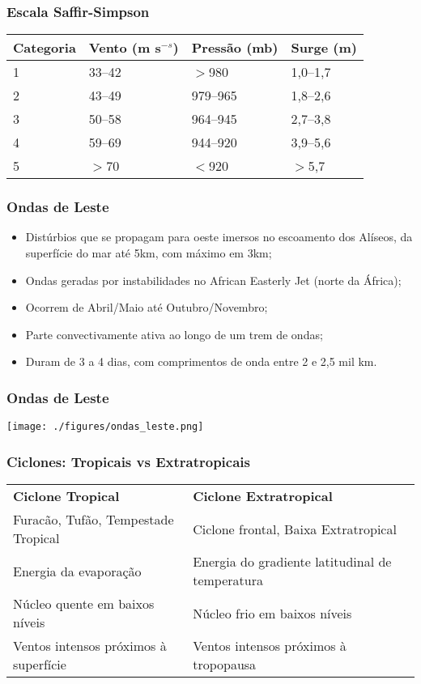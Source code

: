 \begin{frame}
\frametitle{Escala Saffir-Simpson}
{\small
\begin{table}[h]
  \begin{tabular}{|l|l|l|l|}
  \hline
  {\bf Categoria} & {\bf Vento (m s$^{-s}$)} & \bf {Pressão (mb)} & {\bf Surge (m)}\\  \hline \hline
  1 &  33--42 & $>$980   & 1,0--1,7 \\ \hline
  2 &  43--49 & 979--965 & 1,8--2,6 \\ \hline
  3 &  50--58 & 964--945 & 2,7--3,8 \\ \hline
  4 &  59--69 & 944--920 & 3,9--5,6 \\ \hline
  5 &  $>$70  & $<$920   & $>$5,7   \\ \hline
  \end{tabular}
\end{table}
}
\end{frame}

\begin{frame}
\frametitle{Ondas de Leste}
\begin{itemize}[<+-| alert@+>]
  \item Distúrbios que se propagam para oeste imersos no escoamento dos
        Alíseos, da superfície do mar até 5km, com máximo em 3km;
  \item Ondas geradas por instabilidades no African Easterly Jet (norte da
        África);
  \item Ocorrem de Abril/Maio até Outubro/Novembro;
  \item Parte convectivamente ativa ao longo de um trem de ondas;
  \item Duram de 3 a 4 dias, com comprimentos de onda entre 2 e 2,5 mil km.
\end{itemize}
\end{frame}


\begin{frame}
\frametitle{Ondas de Leste}
  \begin{center}
    \texttt{[image: ./figures/ondas\_leste.png]}
  \end{center}
\end{frame}

\begin{frame}
\frametitle{Ciclones: Tropicais vs Extratropicais}
{\scriptsize
\begin{table}[h]
  \begin{tabular}{l|l}
  \hline\hline
  {\bf Ciclone Tropical} & {\bf Ciclone Extratropical} \\
  Furacão, Tufão, Tempestade Tropical & Ciclone frontal, Baixa Extratropical\\
  Energia da evaporação & Energia do gradiente latitudinal de temperatura \\
  Núcleo quente em baixos níveis & Núcleo frio em baixos níveis \\
  Ventos intensos próximos à superfície & Ventos intensos próximos à tropopausa \\
  \hline
  \end{tabular}
\end{table}
}
\end{frame}

